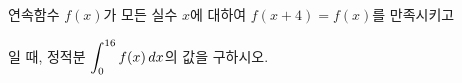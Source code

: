 연속함수 $f(x)$가 모든 실수 $x$에 대하여 $f(x+4)=f(x)$를 만족시키고 \par\smallskip{}\par\smallskip\noindent 일 때, 정적분 $\displaystyle\int_{0}^{16}f(x)\mkern3mu dx$의 값을 구하시오.
